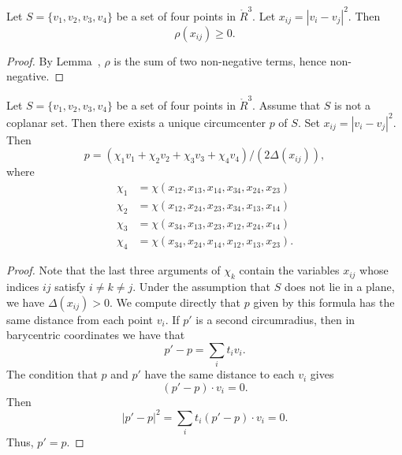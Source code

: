 \begin{tarskidata}
\begin{tarski}
\begin{lemma}
Let $S=\{v_1,v_2,v_3,v_4\}$ be
a set of four points in $\ring{R}^3$.  Let
$x_{ij}=|v_i-v_j|^2$.  Then
	$$\rho(x_{ij})\ge 0.$$
\end{lemma}

\begin{proof} By Lemma~,
$\rho$ is the sum of two non-negative terms, hence
non-negative.
\end{proof}
\end{tarski}





\begin{tarski}

\begin{lemma}
Let $S=\{v_1,v_2,v_3,v_4\}$ be a set of four points in $\ring{R}^3$.
Assume that $S$ is not a coplanar set.  
Then there exists a unique circumcenter $p$
of $S$.  Set $x_{ij} = |v_i-v_j|^2$.
Then 
    $$
    p = (\chi_1 v_1 + \chi_2 v_2 + \chi_3 v_3 + \chi_4
    v_4)/(2\Delta(x_{ij})),
    $$
where
    $$
    \begin{array}{lll}
    \chi_1 &= \chi(x_{12},x_{13},x_{14},x_{34},x_{24},x_{23})\\
    \chi_2 &= \chi(x_{12},x_{24},x_{23},x_{34},x_{13},x_{14})\\
    \chi_3 &= \chi(x_{34},x_{13},x_{23},x_{12},x_{24},x_{14})\\
    \chi_4 &= \chi(x_{34},x_{24},x_{14},x_{12},x_{13},x_{23}).
    \end{array}
    $$
\end{lemma}


\begin{proof}
Note that the last three arguments of $\chi_k$ 
contain the variables $x_{ij}$ whose
indices $ij$ satisfy $i\ne k\ne j$.
Under the assumption that $S$ does not lie
in a plane, we have $\Delta(x_{ij})>0$. 
We compute directly that $p$ given by this
formula has the same distance from each point
$v_i$.  If $p'$ is a second circumradius, then in 
barycentric coordinates we have that
  $$p'-p = \sum_i t_i v_i.$$
The condition that $p$ and $p'$ have the same distance to each $v_i$
gives
  $$(p'-p)\cdot v_i=0.$$
Then $$|p'-p|^2 = \sum_it_i (p'-p)\cdot v_i = 0.$$  
Thus, $p'=p$.
\end{proof}
\end{tarski}






\end{tarskidata}
